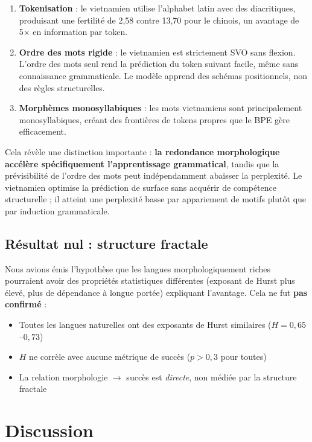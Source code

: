 \documentclass[11pt]{article}
\begin{document}
\begin{enumerate}
    \item \textbf{Tokenisation} : le vietnamien utilise l'alphabet latin avec des diacritiques, produisant une fertilité de 2,58 contre 13,70 pour le chinois, un avantage de 5× en information par token.

    \item \textbf{Ordre des mots rigide} : le vietnamien est strictement SVO sans flexion. L'ordre des mots seul rend la prédiction du token suivant facile, même sans connaissance grammaticale. Le modèle apprend des schémas positionnels, non des règles structurelles.

    \item \textbf{Morphèmes monosyllabiques} : les mots vietnamiens sont principalement monosyllabiques, créant des frontières de tokens propres que le BPE gère efficacement.
\end{enumerate}

Cela révèle une distinction importante : \textbf{la redondance morphologique accélère spécifiquement l'apprentissage grammatical}, tandis que la prévisibilité de l'ordre des mots peut indépendamment abaisser la perplexité. Le vietnamien optimise la prédiction de surface sans acquérir de compétence structurelle ; il atteint une perplexité basse par appariement de motifs plutôt que par induction grammaticale.

\subsection{Résultat nul : structure fractale}

Nous avions émis l'hypothèse que les langues morphologiquement riches pourraient avoir des propriétés statistiques différentes (exposant de Hurst plus élevé, plus de dépendance à longue portée) expliquant l'avantage. Cela ne fut \textbf{pas confirmé} :

\begin{itemize}
    \item Toutes les langues naturelles ont des exposants de Hurst similaires ($H = 0,65$--$0,73$)
    \item $H$ ne corrèle avec aucune métrique de succès ($p > 0,3$ pour toutes)
    \item La relation morphologie $\rightarrow$ succès est \textit{directe}, non médiée par la structure fractale
\end{itemize}

\section{Discussion}
\end{document}
